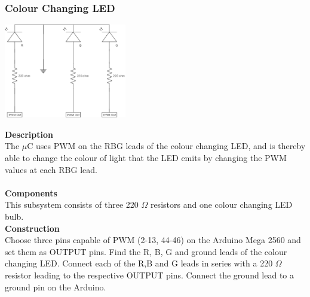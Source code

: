 \documentclass[titlepage]{article}
\begin{document}
\subsubsection{Colour Changing LED}
\begin{center}
	\includegraphics[width = 0.4\textwidth]{ColourChangingLED.png}
\label{fig:ColourChangingLEDFig}
\end{center}
\textbf{Description}\\
The $\mu$C uses PWM on the RBG leads of the colour changing LED, and is thereby able to change the colour of light that the LED emits by changing the PWM values at each RBG lead.\\\\
\textbf{Components}\\
This subsystem consists of three 220 $\Omega$ resistors and one colour changing LED bulb.\\
\textbf{Construction}\\
Choose three pins capable of PWM (2-13, 44-46)  on the Arduino Mega 2560 and set them as OUTPUT pins. Find the R, B, G and ground leads of the colour changing LED. Connect each of the R,B and G leads in series with a 220 $\Omega$ resistor leading to the respective OUTPUT pins. Connect the ground lead to a ground pin on the Arduino.

\newpage
\end{document}
